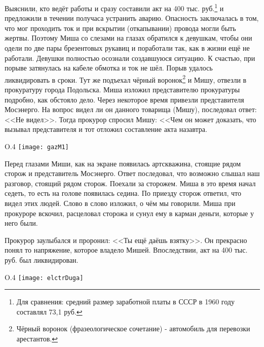 Выяснили, кто ведёт работы и сразу составили акт на 400 тыс. руб.\footnote{Для сравнения: средний размер заработной платы в СССР в 1960 году составлял 73,1 руб.} и предложили в течении получаса устранить аварию. Опасность заключалась в том, что мог проходить ток и при вскрытии (откапывании) провода могли быть жертвы. Поэтому Миша со слезами на глазах обратился к девушкам, чтобы они одели по две пары брезентовых рукавиц и поработали так, как в жизни ещё не работали. Девушки полностью осознали создавшуюся ситуацию. К счастью, при порыве затянулась на кабеле обмотка и ток не шёл. Порыв удалось ликвидировать в сроки. Тут же подъехал чёрный воронок\footnote{Чёрный воронок (фразеологическое сочетание) - автомобиль для перевозки арестантов.} и Мишу, отвезли в прокуратуру города Подольска. Миша изложил представителю прокуратуры подробно, как обстояло дело. Через некоторое время привезли представителя Мосэнерго. На вопрос видел ли он данного товарища (Мишу), последовал ответ: <<Не видел>>. Тогда прокурор спросил Мишу: <<Чем он может доказать, что вызывал представителя и тот отложил составление акта назавтра.

\begin{wrapfigure}{O}{.4\textwidth}
\centering
\texttt{[image: gazM1]}
\caption[Чёрный воронок. Автомобиль ГАЗ-М-1 в Музее отечественной военной истории.]{Чёрный воронок. Автомобиль ГАЗ-М-1 в Музее отечественной военной истории\footnotemark.}
\label{fig:gazM1}
\end{wrapfigure}

Перед глазами Миши, как на экране появилась артскважина, стоящие рядом сторож и представитель Мосэнерго. Ответ последовал, что возможно слышал наш разговор, стоящий рядом сторож. Поехали за сторожем. Миша в это время начал седеть, то есть на голове появилась седина. По приезду сторож ответил, что видел этих людей. Слово в слово изложил, о чём мы говорили. Миша при прокуроре вскочил, расцеловал сторожа и сунул ему в карман деньги, которые у него были.

Прокурор заулыбался и проронил: <<Ты ещё даёшь взятку>>. Он прекрасно понял то напряжение, которое владело Мишей. Впоследствии, акт на 400 тыс. руб. был ликвидирован.

\begin{wrapfigure}{O}{.4\textwidth}
\centering
\texttt{[image: elctrDuga]}
\caption{Вольтова (электрическая) дуга.}
\label{fig:elctrDuga}
\end{wrapfigure}

